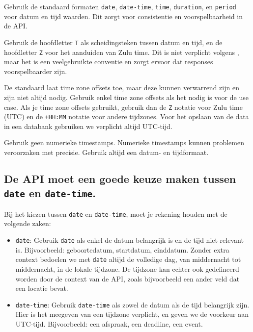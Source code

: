Gebruik de standaard formaten \texttt{date}, \texttt{date-time}, \texttt{time}, \texttt{duration}, en \texttt{period} voor datum en tijd waarden. Dit zorgt voor consistentie en voorspelbaarheid in de API.

\bigskip

Gebruik de hoofdletter \texttt{T} als scheidingsteken tussen datum en tijd, en de hoofdletter \texttt{Z} voor het aanduiden van Zulu time. Dit is niet verplicht volgens \textcite{rfc3339}, maar het is een veelgebruikte conventie en zorgt ervoor dat responses voorspelbaarder zijn.

\bigskip

De standaard laat time zone offsets toe, maar deze kunnen verwarrend zijn en zijn niet altijd nodig. Gebruik enkel time zone offsets als het nodig is voor de use case. Als je time zone offsets gebruikt, gebruik dan de \texttt{Z} notatie voor Zulu time (UTC) en de \texttt{+HH:MM} notatie voor andere tijdzones. Voor het opslaan van de data in een databank gebruiken we verplicht altijd UTC-tijd.

\bigskip

Gebruik geen numerieke timestamps. Numerieke timestamps kunnen problemen veroorzaken met precisie. Gebruik altijd een datum- en tijdformaat.

\subsection{De API moet een goede keuze maken tussen \texttt{date} en \texttt{date-time}.}
\label{section:keuze_date_date_time}

Bij het kiezen tussen \texttt{date} en \texttt{date-time}, moet je rekening houden met de volgende zaken:

\begin{itemize}
    \item \texttt{date}: Gebruik \texttt{date} als enkel de datum belangrijk is en de tijd niet relevant is. Bijvoorbeeld: geboortedatum, startdatum, einddatum. Zonder extra context bedoelen we met \texttt{date} altijd de volledige dag, van middernacht tot middernacht, in de lokale tijdzone. De tijdzone kan echter ook gedefineerd worden door de context van de API, zoals bijvoorbeeld een ander veld dat een locatie bevat.
    \item \texttt{date-time}: Gebruik \texttt{date-time} als zowel de datum als de tijd belangrijk zijn. Hier is het meegeven van een tijdzone verplicht, en geven we de voorkeur aan UTC-tijd. Bijvoorbeeld: een afspraak, een deadline, een event.
\end{itemize}

